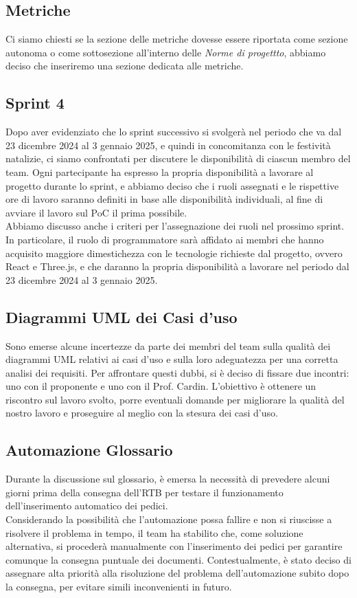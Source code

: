 \subsection{Metriche}
Ci siamo chiesti se la sezione delle metriche dovesse essere riportata come sezione autonoma o come sottosezione all'interno delle \textit{Norme di progettto}, abbiamo deciso che inseriremo una sezione dedicata alle metriche.

\subsection{Sprint 4}
Dopo aver evidenziato che lo sprint successivo si svolgerà nel periodo che va dal 23 dicembre 2024 al 3 gennaio 2025, e quindi in concomitanza con le festività natalizie, ci siamo confrontati per discutere le disponibilità di ciascun membro del team. Ogni partecipante ha espresso la propria disponibilità a lavorare al progetto durante lo sprint, e abbiamo deciso che i ruoli assegnati e le rispettive ore di lavoro saranno definiti in base alle disponibilità individuali, al fine di avviare il lavoro sul PoC il prima possibile.\\
Abbiamo discusso anche i criteri per l'assegnazione dei ruoli nel prossimo sprint. In particolare, il ruolo di programmatore sarà affidato ai membri che hanno acquisito maggiore dimestichezza con le tecnologie richieste dal progetto, ovvero React e Three.js, e che daranno la propria disponibilità a lavorare nel periodo dal 23 dicembre 2024 al 3 gennaio 2025.  

\subsection{Diagrammi UML dei Casi d'uso}
Sono emerse alcune incertezze da parte dei membri del team sulla qualità dei diagrammi UML relativi ai casi d'uso e sulla loro adeguatezza per una corretta analisi dei requisiti. Per affrontare questi dubbi, si è deciso di fissare due incontri: uno con il proponente e uno con il Prof. Cardin. L'obiettivo è ottenere un riscontro sul lavoro svolto, porre eventuali domande per migliorare la qualità del nostro lavoro e proseguire al meglio con la stesura dei casi d'uso.  

\subsection{Automazione Glossario}
Durante la discussione sul glossario, è emersa la necessità di prevedere alcuni giorni prima della consegna dell'RTB per testare il funzionamento dell'inserimento automatico dei pedici. 
\\Considerando la possibilità che l'automazione possa fallire e non si riuscisse a risolvere il problema in tempo, il team ha stabilito che, come soluzione alternativa, si procederà manualmente con l'inserimento dei pedici per garantire comunque la consegna puntuale dei documenti. 
Contestualmente, è stato deciso di assegnare alta priorità alla risoluzione del problema dell'automazione subito dopo la consegna, per evitare simili inconvenienti in futuro.

